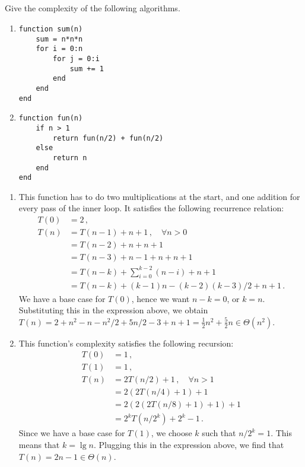 \subsection{} %
Give the complexity of the following algorithms.
\begin{enumerate}
\item
\begin{verbatim}
function sum(n)
	sum = n*n*n
	for i = 0:n
		for j = 0:i
			sum += 1
		end
	end
end
\end{verbatim}
\item
\begin{verbatim}
function fun(n)
	if n > 1
		return fun(n/2) + fun(n/2)
	else
		return n
	end
end
\end{verbatim}
\end{enumerate}

\begin{solution}
\begin{enumerate}
	\item This function has to do two multiplications at the start,
	and one addition
	for every pass of the inner loop.
	It satisfies the following recurrence relation:
	\begin{align*}
		T(0) &= 2\,,\\
		T(n) &= T(n-1) + n + 1\,,\quad \forall n > 0\\
		&= T(n-2) + n + n + 1\\
		&= T(n-3) + n - 1 + n + n + 1\\
		&= T(n-k) + \sum_{i = 0}^{k-2} (n - i) + n + 1\\
		&= T(n-k) + (k-1)n - (k-2)(k-3)/2 + n + 1\,.
	\end{align*}
	We have a base case for \(T(0)\),
	hence we want \(n-k = 0\), or \(k = n\).
	Substituting this in the expression above,
	we obtain
	\(T(n) = 2 + n^2 - n - n^2/2 + 5n/2 - 3 + n + 1 =
	\frac{1}{2} n^2 + \frac{5}{2} n \in \Theta(n^2)\).
	\item This function's complexity satisfies the following recursion:
	\begin{align*}
		T(0) &= 1\,,\\
		T(1) &= 1\,,\\
		T(n) &= 2 T(n/2) + 1\,, \quad \forall n > 1\\
		&= 2 (2 T(n/4) + 1) + 1\\
		&= 2 (2 (2 T(n/8) + 1) + 1) + 1\\
		&= 2^k T(n/2^k) + 2^k - 1\,.
	\end{align*}
	Since we have a base case for \(T(1)\),
	we choose \(k\) such that \(n/2^k = 1\).
	This means that \(k = \lg n\).
	Plugging this in the expression above,
	we find that \(T(n) = 2n-1 \in \Theta(n)\).
\end{enumerate}
\end{solution}


